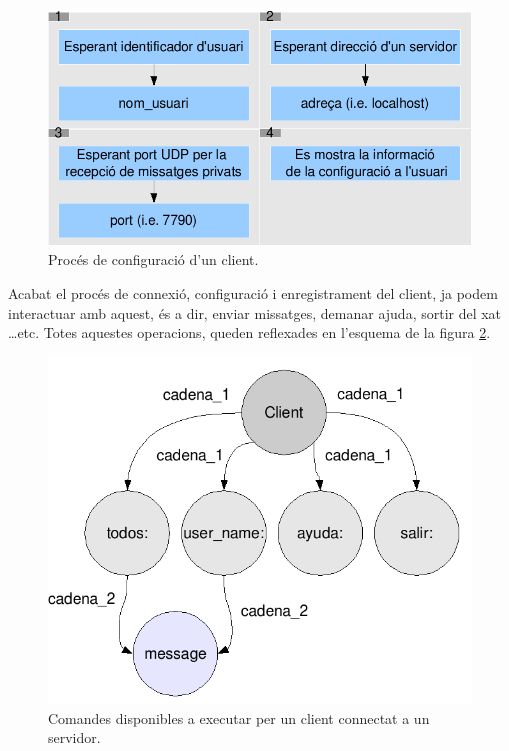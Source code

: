 \documentclass[a4paper,10pt]{article}
\begin{document}
			        \begin{figure}[h]
				\begin{center}
				\includegraphics[scale=0.4]{config.png}
				\caption{Procés de configuració d'un client.}
				\label{config}
				\end{center}
				\end{figure}

		Acabat el procés de connexió, configuració i enregistrament del client, ja podem interactuar amb aquest, és a dir, enviar missatges, demanar ajuda, sortir del xat \ldots etc. Totes aquestes operacions, queden reflexades en l'esquema de la figura \ref{user_actions}.

			        \begin{figure}[h]
				\begin{center}
				\includegraphics[scale=0.4]{user_actions.png}
				\caption{Comandes disponibles a executar per un client connectat a un servidor.}
				\label{user_actions}
				\end{center}
				\end{figure}
\end{document}
